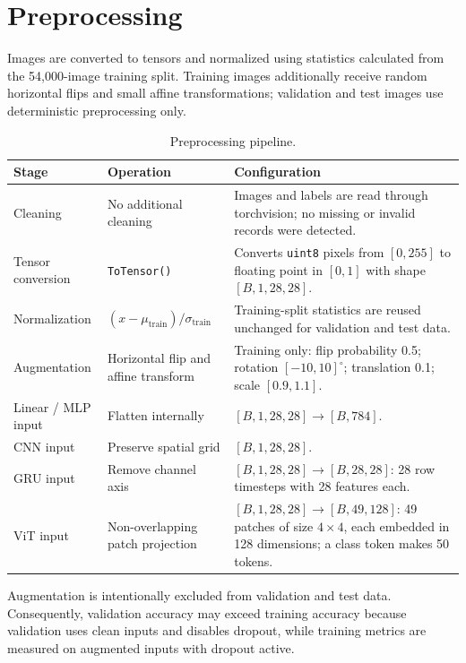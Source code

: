 \section{Preprocessing}

Images are converted to tensors and normalized using statistics calculated from the 54,000-image training split. Training images additionally receive random horizontal flips and small affine transformations; validation and test images use deterministic preprocessing only.

\begin{table}[H]
    \centering
    \caption{Preprocessing pipeline.}
    \label{tab:preprocessing}
    \begin{tabularx}{\textwidth}{@{}lXX@{}}
        \toprule
        Stage & Operation & Configuration \\
        \midrule
        Cleaning & No additional cleaning & Images and labels are read through torchvision; no missing or invalid records were detected. \\
        Tensor conversion & \texttt{ToTensor()} & Converts \texttt{uint8} pixels from $[0,255]$ to floating point in $[0,1]$ with shape $[B,1,28,28]$. \\
        Normalization & $(x-\mu_{\mathrm{train}})/\sigma_{\mathrm{train}}$ & Training-split statistics are reused unchanged for validation and test data. \\
        Augmentation & Horizontal flip and affine transform & Training only: flip probability 0.5; rotation $[-10,10]^{\circ}$; translation 0.1; scale $[0.9,1.1]$. \\
        Linear / MLP input & Flatten internally & $[B,1,28,28]\rightarrow[B,784]$. \\
        CNN input & Preserve spatial grid & $[B,1,28,28]$. \\
        GRU input & Remove channel axis & $[B,1,28,28]\rightarrow[B,28,28]$: 28 row timesteps with 28 features each. \\
        ViT input & Non-overlapping patch projection & $[B,1,28,28]\rightarrow[B,49,128]$: 49 patches of size $4\times4$, each embedded in 128 dimensions; a class token makes 50 tokens. \\
        \bottomrule
    \end{tabularx}
\end{table}

Augmentation is intentionally excluded from validation and test data. Consequently, validation accuracy may exceed training accuracy because validation uses clean inputs and disables dropout, while training metrics are measured on augmented inputs with dropout active.
